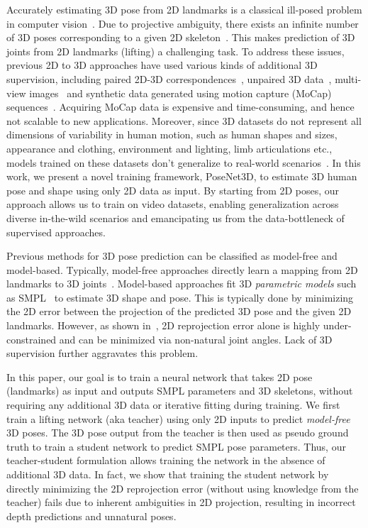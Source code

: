 \documentclass[10pt,twocolumn,letterpaper]{article}
\begin{document}
Accurately estimating 3D pose from 2D landmarks is a classical ill-posed problem in computer vision~\cite{forsyth2006computational,hogg1983model}. Due to projective ambiguity, there exists an infinite number of 3D poses corresponding to a given 2D skeleton~\cite{chingCVPR2019}. This makes prediction of 3D joints from 2D landmarks (lifting) a challenging task. To address these issues, previous 2D to 3D approaches have used various kinds of additional 3D supervision, including paired 2D-3D correspondences~\cite{MartinezICCV2017}, unpaired 3D data~\cite{kanazawa2018end}, multi-view images~\cite{rhodin2018learning} and synthetic data generated using motion capture (MoCap) sequences~\cite{pavlakos2018humanshape}. Acquiring MoCap data is expensive and time-consuming, and hence not scalable to new applications. Moreover, since 3D datasets do not represent all dimensions of variability in human motion, such as human shapes and sizes, appearance and clothing, environment and lighting, limb articulations etc., models trained on these datasets don't generalize to real-world scenarios~\cite{kanazawa2019learning}. In this work, we present a novel training framework, PoseNet3D, to estimate 3D human pose and shape using only 2D data as input. By starting from 2D poses, our approach allows us to train on video datasets, enabling generalization across diverse in-the-wild scenarios and emancipating us from the data-bottleneck of supervised approaches. 

Previous methods for 3D pose prediction can be classified as {model-free} and {model-based}. Typically, {model-free} approaches directly learn a mapping from 2D landmarks to 3D joints~\cite{chingCVPR2019,orinet,MartinezICCV2017}.  {Model-based} approaches fit 3D \textit{parametric models} such as SMPL~\cite{loper2015smpl} to estimate 3D shape and pose. This is typically done by minimizing the 2D error between the projection of the predicted 3D pose and the given 2D landmarks. However, as shown in~\cite{kanazawa2018end}, 2D reprojection error alone is highly under-constrained and can be minimized via non-natural joint angles. Lack of 3D supervision further aggravates this problem. 

In this paper, our goal is to train a neural network that takes 2D pose (landmarks) as input and outputs SMPL parameters and 3D skeletons, without requiring any additional 3D data or iterative fitting during training. We first train a lifting network (aka teacher) using only 2D inputs to predict \textit{model-free} 3D poses. The 3D pose output from the teacher is then used as pseudo ground truth to train a student network to predict SMPL pose parameters. Thus, our teacher-student formulation allows training the network in the absence of additional 3D data. In fact, we show that training the student network by directly minimizing the 2D reprojection error (without using knowledge from the teacher) fails due to inherent ambiguities in 2D projection, resulting in incorrect depth predictions and unnatural poses. 
\end{document}
